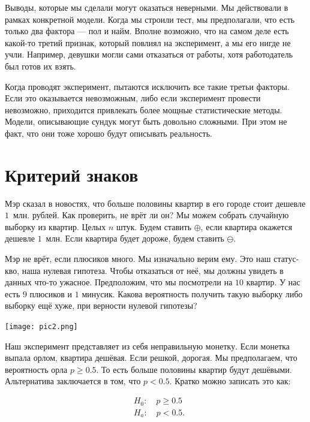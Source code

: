 \documentclass[12pt, a4paper, oneside]{article}
\begin{document}
Выводы, которые мы сделали могут оказаться неверными. Мы действовали в рамках конкретной модели. Когда мы строили тест, мы предполагали, что есть только два фактора --- пол и найм. Вполне возможно, что на самом деле есть какой-то третий признак, который повлиял на эксперимент, а мы его нигде не учли. Например, девушки могли сами отказаться от работы, хотя работодатель был готов их взять. 

Когда проводят эксперимент, пытаются исключить все такие третьи факторы. Если это оказывается невозможным, либо если эксперимент провести невозможно, приходится привлекать более мощные статистические методы. Модели, описывающие сундук могут быть довольно сложными. При этом не факт, что они тоже хорошо будут описывать реальность. 

\section{Критерий знаков}

Мэр сказал в новостях, что больше половины квартир в его городе стоит дешевле $1$~млн. рублей. Как проверить, не врёт ли он? Мы можем собрать случайную выборку из квартир. Целых $n$ штук. Будем ставить $\oplus$, если квартира окажется дешевле $1$~млн. Если квартира будет дороже, будем ставить $\ominus$. 

Мэр не врёт, если плюсиков много. Мы изначально верим ему. Это наш статус-кво, наша нулевая гипотеза. Чтобы отказаться от неё, мы должны увидеть в данных что-то ужасное. Предположим, что мы посмотрели на $10$ квартир. У нас есть $9$ плюсиков и $1$ минусик. Какова вероятность получить такую выборку либо выборку ещё хуже, при верности нулевой гипотезы? 

\begin{center} 
\texttt{[image: pic2.png]}
\end{center} 

Наш эксперимент представляет из себя неправильную монетку. Если монетка выпала орлом, квартира дешёвая. Если решкой, дорогая. Мы предполагаем, что вероятность орла $p \ge 0.5$. То есть больше половины квартир будут дешёвыми. Альтернатива заключается в том, что $p < 0.5$.  Кратко можно записать это как: 

\begin{equation*} 
    \begin{aligned} 
        &H_0: \quad p \ge 0.5 \\
        &H_a: \quad p < 0.5.
    \end{aligned} 
\end{equation*}
\end{document}
